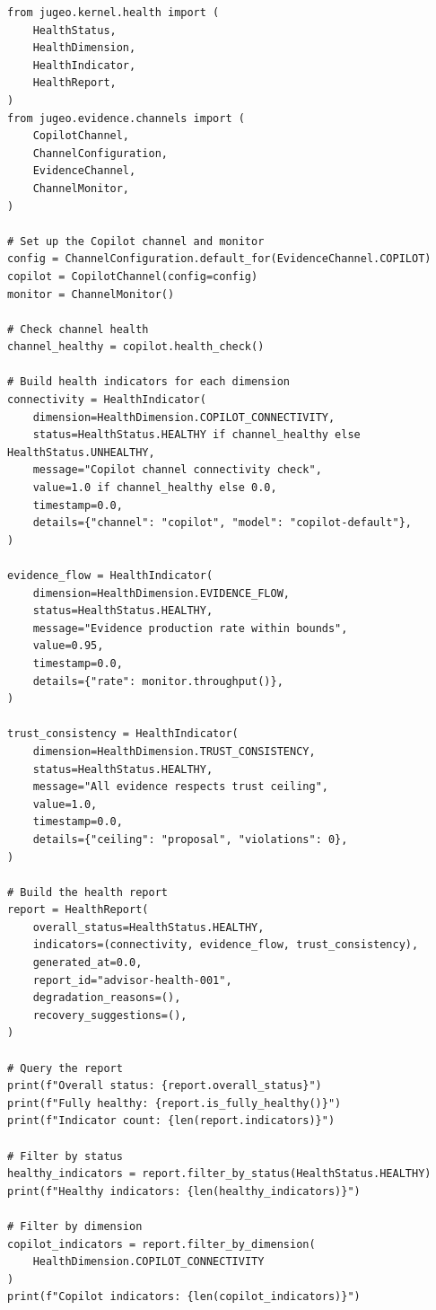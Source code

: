 \documentclass[11pt]{article}
\begin{document}
\begin{lstlisting}[style=jugeo-python, caption={Health monitoring for the advisor subsystem.}, label=lst:health]
from jugeo.kernel.health import (
    HealthStatus,
    HealthDimension,
    HealthIndicator,
    HealthReport,
)
from jugeo.evidence.channels import (
    CopilotChannel,
    ChannelConfiguration,
    EvidenceChannel,
    ChannelMonitor,
)

# Set up the Copilot channel and monitor
config = ChannelConfiguration.default_for(EvidenceChannel.COPILOT)
copilot = CopilotChannel(config=config)
monitor = ChannelMonitor()

# Check channel health
channel_healthy = copilot.health_check()

# Build health indicators for each dimension
connectivity = HealthIndicator(
    dimension=HealthDimension.COPILOT_CONNECTIVITY,
    status=HealthStatus.HEALTHY if channel_healthy else HealthStatus.UNHEALTHY,
    message="Copilot channel connectivity check",
    value=1.0 if channel_healthy else 0.0,
    timestamp=0.0,
    details={"channel": "copilot", "model": "copilot-default"},
)

evidence_flow = HealthIndicator(
    dimension=HealthDimension.EVIDENCE_FLOW,
    status=HealthStatus.HEALTHY,
    message="Evidence production rate within bounds",
    value=0.95,
    timestamp=0.0,
    details={"rate": monitor.throughput()},
)

trust_consistency = HealthIndicator(
    dimension=HealthDimension.TRUST_CONSISTENCY,
    status=HealthStatus.HEALTHY,
    message="All evidence respects trust ceiling",
    value=1.0,
    timestamp=0.0,
    details={"ceiling": "proposal", "violations": 0},
)

# Build the health report
report = HealthReport(
    overall_status=HealthStatus.HEALTHY,
    indicators=(connectivity, evidence_flow, trust_consistency),
    generated_at=0.0,
    report_id="advisor-health-001",
    degradation_reasons=(),
    recovery_suggestions=(),
)

# Query the report
print(f"Overall status: {report.overall_status}")
print(f"Fully healthy: {report.is_fully_healthy()}")
print(f"Indicator count: {len(report.indicators)}")

# Filter by status
healthy_indicators = report.filter_by_status(HealthStatus.HEALTHY)
print(f"Healthy indicators: {len(healthy_indicators)}")

# Filter by dimension
copilot_indicators = report.filter_by_dimension(
    HealthDimension.COPILOT_CONNECTIVITY
)
print(f"Copilot indicators: {len(copilot_indicators)}")


\end{lstlisting}
\end{document}

